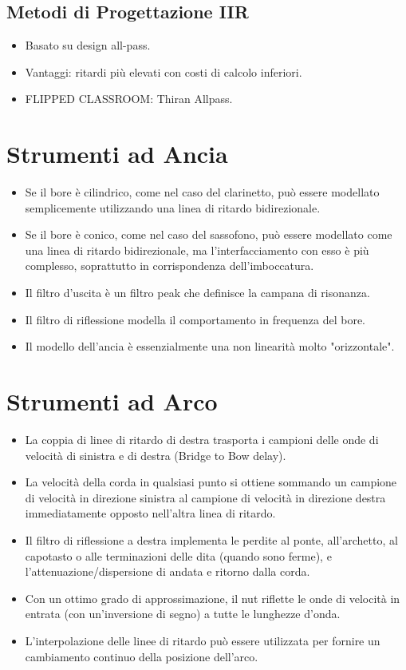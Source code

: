 \subsection{Metodi di Progettazione IIR}

\begin{itemize}
    \item Basato su design all-pass.
    \item Vantaggi: ritardi più elevati con costi di calcolo inferiori.
    \item FLIPPED CLASSROOM: Thiran Allpass.
\end{itemize}

\section{Strumenti ad Ancia}

\begin{itemize}
    \item Se il bore è cilindrico, come nel caso del clarinetto, può essere modellato semplicemente utilizzando una linea di ritardo bidirezionale.
    \item Se il bore è conico, come nel caso del sassofono, può essere modellato come una linea di ritardo bidirezionale, ma l'interfacciamento con esso è più complesso, soprattutto in corrispondenza dell'imboccatura.
    \item Il filtro d'uscita è un filtro peak che definisce la campana di risonanza.
    \item Il filtro di riflessione modella il comportamento in frequenza del bore.
    \item Il modello dell'ancia è essenzialmente una non linearità molto "orizzontale".
\end{itemize}

\section{Strumenti ad Arco}

\begin{itemize}
    \item La coppia di linee di ritardo di destra trasporta i campioni delle onde di velocità di sinistra e di destra (Bridge to Bow delay).
    \item La velocità della corda in qualsiasi punto si ottiene sommando un campione di velocità in direzione sinistra al campione di velocità in direzione destra immediatamente opposto nell'altra linea di ritardo.
    \item Il filtro di riflessione a destra implementa le perdite al ponte, all'archetto, al capotasto o alle terminazioni delle dita (quando sono ferme), e l'attenuazione/dispersione di andata e ritorno dalla corda.
    \item Con un ottimo grado di approssimazione, il nut riflette le onde di velocità in entrata (con un'inversione di segno) a tutte le lunghezze d'onda.
    \item L'interpolazione delle linee di ritardo può essere utilizzata per fornire un cambiamento continuo della posizione dell'arco.
\end{itemize}

